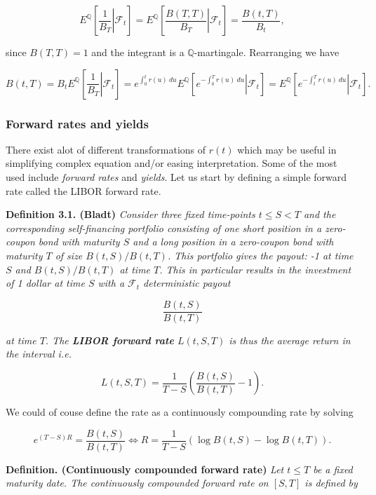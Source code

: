 \documentclass[a4paper,12pt,openany]{book}
\begin{document}
\[
E^{\mathbb Q}\left[\left.\frac{1}{B_T}\right\vert \mathcal F_t\right]=E^{\mathbb Q}\left[\left.\frac{B(T,T)}{B_T}\right\vert \mathcal F_t\right]=\frac{B(t,T)}{B_t},
\]

since \(B(T,T)=1\) and the integrant is a \(\mathbb Q\)-martingale. Rearranging we have

\[
B(t,T)=B_tE^{\mathbb Q}\left[\left.\frac{1}{B_T}\right\vert \mathcal F_t\right]=e^{\int_0^t r(u)\ du}E^{\mathbb Q}\left[\left.e^{-\int_0^T r(u)\ du}\right\vert \mathcal F_t\right]=E^{\mathbb Q}\left[\left.e^{-\int_t^T r(u)\ du}\right\vert \mathcal F_t\right].\tag{11}
\]

\hypertarget{forward-rates-and-yields}{%
\subsubsection{Forward rates and yields}\label{forward-rates-and-yields}}

There exist alot of different transformations of \(r(t)\) which may be useful in simplifying complex equation and/or easing interpretation. Some of the most used include \emph{forward rates} and \emph{yields}. Let us start by defining a simple forward rate called the LIBOR forward rate.

\textbf{Definition 3.1. (Bladt)} \emph{Consider three fixed time-points \(t\le S< T\) and the corresponding self-financing portfolio consisting of one short position in a zero-coupon bond with maturity \(S\) and a long position in a zero-coupon bond with maturity \(T\) of size \(B(t,S)/B(t,T)\). This portfolio gives the payout: -1 at time \(S\) and \(B(t,S)/B(t,T)\) at time \(T\). This in particular results in the investment of 1 dollar at time \(S\) with a \(\mathcal F_t\) deterministic payout}

\[
\frac{B(t,S)}{B(t,T)}
\]

\emph{at time \(T\). The \textbf{LIBOR forward rate} \(L(t,S,T)\) is thus the average return in the interval i.e.}

\[
L(t,S,T)=\frac{1}{T-S}\left(\frac{B(t,S)}{B(t,T)}-1\right).
\]

We could of couse define the rate as a continuously compounding rate by solving

\[
e^{(T-S)R}=\frac{B(t,S)}{B(t,T)}\iff R=\frac{1}{T-S}\left(\log B(t,S)-\log B(t,T)\right).
\]

\textbf{Definition. (Continuously compounded forward rate)} \emph{Let \(t\le T\) be a fixed maturity date. The continuously compounded forward rate on \([S,T]\) is defined by}
\end{document}
